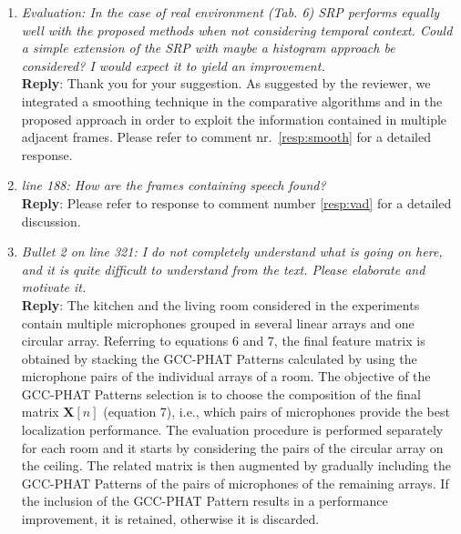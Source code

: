 \documentclass[11pt, technote, letterpaper, oneside, onecolumn]{IEEEtran}
\begin{document}
\begin{enumerate}

\item \textit{Evaluation: In the case of real environment (Tab. 6) SRP performs equally well with the proposed methods when not considering temporal context. Could a simple extension of the SRP with maybe a histogram approach be considered? I would expect it to yield an improvement.\\}
\textbf{Reply}: Thank you for your suggestion. As suggested by the reviewer, we integrated a smoothing technique in the comparative algorithms and in the proposed approach in order to exploit the information contained in multiple adjacent frames. Please refer to comment nr.\ \ref{resp:smooth} for a detailed response.


\item \textit{line 188: How are the frames containing speech found?\\}
\textbf{Reply}: Please refer to response to comment number \ref{resp:vad} for a detailed discussion.

\item \textit{Bullet 2 on line 321: I do not completely understand what is going on here, and it is quite difficult to understand from the text. Please elaborate and motivate it.\\}
\textbf{Reply}: The kitchen and the living room considered in the experiments contain multiple microphones grouped in several linear arrays and one circular array. Referring to equations 6 and 7, the final feature matrix is obtained by stacking the GCC-PHAT Patterns calculated by using the microphone pairs of the individual arrays of a room. The objective of the GCC-PHAT Patterns selection is to choose the composition of the final matrix $\mathbf{X}[n]$ (equation 7), i.e., which pairs of microphones provide the best localization performance. The evaluation procedure is performed separately for each room and it starts by considering the pairs of the circular array on the ceiling. The related matrix is then augmented by gradually including the GCC-PHAT Patterns of the pairs of microphones of the remaining arrays. If the inclusion of the GCC-PHAT Pattern results in a performance improvement, it is retained, otherwise it is discarded. %


\end{enumerate}
\end{document}
